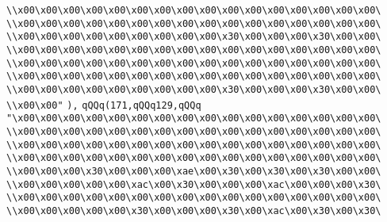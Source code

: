 \verb|\\x00\x00\x00\x00\x00\x00\x00\x00\x00\x00\x00\x00\x00\x00\x00\x00\|\newline
\verb|\\x00\x00\x00\x00\x00\x00\x00\x00\x00\x00\x00\x00\x00\x00\x00\x00\|\newline
\verb|\\x00\x00\x00\x00\x00\x00\x00\x00\x00\x30\x00\x00\x00\x30\x00\x00\|\newline
\verb|\\x00\x00\x00\x00\x00\x00\x00\x00\x00\x00\x00\x00\x00\x00\x00\x00\|\newline
\verb|\\x00\x00\x00\x00\x00\x00\x00\x00\x00\x00\x00\x00\x00\x00\x00\x00\|\newline
\verb|\\x00\x00\x00\x00\x00\x00\x00\x00\x00\x00\x00\x00\x00\x00\x00\x00\|\newline
\verb|\\x00\x00\x00\x00\x00\x00\x00\x00\x00\x30\x00\x00\x00\x30\x00\x00\|\newline
\verb|\\x00\x00"|\newline
\verb|),|\newline
\verb|qQQq(171,qQQq129,qQQq|\newline
\verb|"\x00\x00\x00\x00\x00\x00\x00\x00\x00\x00\x00\x00\x00\x00\x00\x00\|\newline
\verb|\\x00\x00\x00\x00\x00\x00\x00\x00\x00\x00\x00\x00\x00\x00\x00\x00\|\newline
\verb|\\x00\x00\x00\x00\x00\x00\x00\x00\x00\x00\x00\x00\x00\x00\x00\x00\|\newline
\verb|\\x00\x00\x00\x00\x00\x00\x00\x00\x00\x00\x00\x00\x00\x00\x00\x00\|\newline
\verb|\\x00\x00\x00\x30\x00\x00\x00\xae\x00\x30\x00\x30\x00\x30\x00\x00\|\newline
\verb|\\x00\x00\x00\x00\x00\xac\x00\x30\x00\x00\x00\xac\x00\x00\x00\x30\|\newline
\verb|\\x00\x00\x00\x00\x00\x00\x00\x00\x00\x00\x00\x00\x00\x00\x00\x00\|\newline
\verb|\\x00\x00\x00\x00\x00\x30\x00\x00\x00\x30\x00\xac\x00\x30\x00\x30\|\newline
